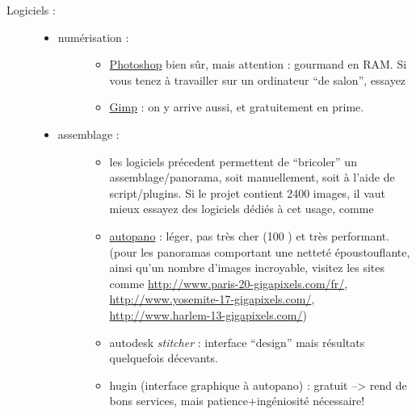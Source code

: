\documentclass[a4paper,12pt,french]{sphinxmanual}
\begin{document}
\begin{description}
\item[{Logiciels :}] \leavevmode\begin{itemize}
\item {} \begin{description}
\item[{numérisation :}] \leavevmode\begin{itemize}
\item {} 
\href{http://www.adobe.com/fr/products/photoshop/photoshop/}{Photoshop} bien sûr, mais attention : gourmand en RAM. Si vous tenez à travailler sur un ordinateur ``de salon'', essayez

\item {} 
\href{http://www.gimp.org/}{Gimp} : on y arrive aussi, et gratuitement en prime.

\end{itemize}

\end{description}

\item {} \begin{description}
\item[{assemblage :}] \leavevmode\begin{itemize}
\item {} 
les logiciels précedent permettent de ``bricoler'' un assemblage/panorama, soit manuellement, soit à l'aide de script/plugins. Si le projet contient 2400 images, il vaut mieux essayez des logiciels dédiés à cet usage, comme

\item {} 
\href{http://www.autopano.net/fr}{autopano} : léger, pas très cher (100 \texteuro{}) et très performant. (pour les panoramas comportant une netteté époustouflante, ainsi qu'un nombre d'images incroyable, visitez les sites comme \url{http://www.paris-20-gigapixels.com/fr/}, \url{http://www.yosemite-17-gigapixels.com/}, \url{http://www.harlem-13-gigapixels.com/})

\item {} 
autodesk \emph{stitcher} : interface ``design'' mais résultats quelquefois décevants.

\item {} 
hugin (interface graphique à autopano) : gratuit --\textgreater{} rend de bons services, mais patience+ingéniosité nécessaire!

\end{itemize}

\end{description}

\end{itemize}

\end{description}
\end{document}
